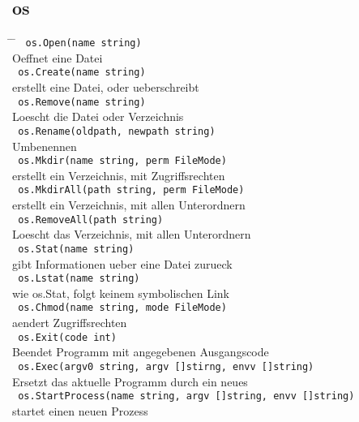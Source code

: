 \documentclass[twoside,a4paper,12pt]{article}
\begin{document}
\newpage
\subsection{os}
\begin{tabbing}
 \hspace{2mm} \= \hspace{50mm} \= \kill
 \> \verb| os.Open(name string) | \\ 
 \> Oeffnet eine Datei \\ 
 \> \verb| os.Create(name string) | \\ 
 \> erstellt eine Datei, oder ueberschreibt \\ 
 \> \verb| os.Remove(name string) |  \\
 \> Loescht die Datei oder Verzeichnis \\
 \> \verb| os.Rename(oldpath, newpath string) | \\ 
 \> Umbenennen \\ 
 \> \verb| os.Mkdir(name string, perm FileMode) | \\ 
 \> erstellt ein Verzeichnis, mit Zugriffsrechten \\
 \> \verb| os.MkdirAll(path string, perm FileMode) |  \\ 
 \> erstellt ein Verzeichnis, mit allen Unterordnern \\ 
 \> \verb| os.RemoveAll(path string) | \\ 
 \> Loescht das Verzeichnis, mit allen Unterordnern \\
 \> \verb| os.Stat(name string) | \\ 
 \> gibt Informationen ueber eine Datei zurueck \\ 
 \> \verb| os.Lstat(name string) | \\ 
 \> wie os.Stat, folgt keinem symbolischen Link \\ 
 \> \verb| os.Chmod(name string, mode FileMode) | \\ 
 \> aendert Zugriffsrechten \\
 \> \verb| os.Exit(code int) | \\ 
 \> Beendet Programm mit angegebenen Ausgangscode \\ 
 \> \verb| os.Exec(argv0 string, argv []stirng, envv []string) | \\ 
 \> \> Ersetzt das aktuelle Programm durch ein neues \\ 
 \> \verb| os.StartProcess(name string, argv []string, envv []string) | \\ 
 \> \> startet einen neuen Prozess \\ 

\end{tabbing}
\end{document}
